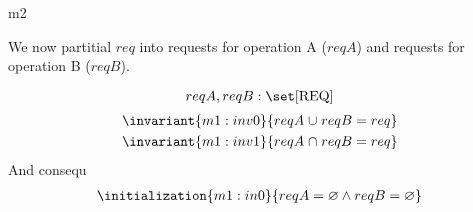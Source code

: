 \documentclass[12pt]{amsart}
\newcommand{\REQ}{\text{REQ}}
\begin{document}
% 
\begin{machine}{m2}

We now partitial $req$ into requests for operation A ($reqA$) and
requests for operation B ($reqB$).

\[ \variable{ reqA, reqB : \set [\REQ] } \]
\begin{align*}
	\invariant{m1:inv0}{ reqA \bunion reqB = req } \\
	\invariant{m1:inv1}{ reqA \binter reqB = req } 
\end{align*}
And consequ
\begin{align*}
	\initialization{m1:in0}{ reqA = \emptyset \land reqB = \emptyset }
\end{align*}
\end{machine}
\end{document}
